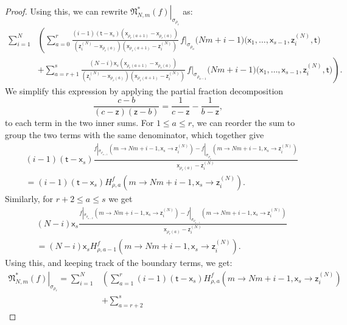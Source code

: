 \documentclass[11pt]{article}
\theoremstyle{definition}
\begin{document}
\begin{proof}
	Using this, we can rewrite $\left.\mathfrak{N}_{N,m}^{\ast}(f)\right|_{\sigma_{\rho_r}}$ as:
	\begin{align*}
		\sum_{i=1}^{N}&\left(\sum_{a=0}^{r}
			\frac{(i-1)(\mathsf{t}-\mathsf{x}_s)(\mathsf{x}_{\rho_r(a+1)}-\mathsf{x}_{\rho_r(a)})}{(\mathsf{z}_i^{(N)}-\mathsf{x}_{\rho_r(a)})(\mathsf{x}_{\rho_r(a+1)}-\mathsf{z}_i^{(N)})}\,
			f|_{\sigma_{\rho_a}}
			\bigl(Nm+i-1\bigr)
			\bigl(\mathsf{x}_1,\dots,\mathsf{x}_{s-1},\mathsf{z}_i^{(N)},\mathsf{t}\bigr)\right.\\
		&\left.+\sum_{a=r+1}^{s}
			  \frac{(N-i)\mathsf{x}_s(\mathsf{x}_{\rho_r(a+1)}-\mathsf{x}_{\rho_r(a)})}{(\mathsf{z}_i^{(N)}-\mathsf{x}_{\rho_r(a)})(\mathsf{x}_{\rho_r(a+1)}-\mathsf{z}_i^{(N)})}\,
			  f|_{\sigma_{\rho_{a-1}}}
			  \bigl(Nm+i-1\bigr)
		  \bigl(\mathsf{x}_1,\dots,\mathsf{x}_{s-1},\mathsf{z}_i^{(N)},\mathsf{t}\bigr)\right).
	\end{align*}
	We simplify this expression by applying the partial fraction decomposition
	\[
		\frac{c-b}{(c-\mathsf{z})(\mathsf{z}-b)}=\frac{1}{c-\mathsf{z}}-\frac{1}{b-\mathsf{z}},
	\]
	to each term in the two inner sums. For $1\le a\le r$, we can reorder the sum to group the two terms with the same denominator, which together give
	\begin{align*}
	&(i-1)(\mathsf{t}-\mathsf{x}_s)\frac{f|_{\sigma_{\rho_{a-1}}}(m\to Nm+i-1,\mathsf{x}_s\to \mathsf{z}_i^{(N)})-f|_{\sigma_{\rho_a}}(m\to Nm+i-1,\mathsf{x}_s\to \mathsf{z}_i^{(N)})}{\mathsf{x}_{\rho_r(a)}-\mathsf{z}_i^{(N)}}\\
	&=(i-1)(\mathsf{t}-\mathsf{x}_s)H_{\rho,a}^f(m\to Nm+i-1,\mathsf{x}_s\to \mathsf{z}_i^{(N)}).
	\end{align*}
	Similarly, for $r+2\le a\le s$ we get
	\begin{align*}
&(N-i)\mathsf{x}_s\frac{f|_{\sigma_{\rho_{a-2}}}(m\to Nm+i-1,\mathsf{x}_s\to \mathsf{z}_i^{(N)})-f|_{\sigma_{\rho_{a-1}}}(m\to Nm+i-1,\mathsf{x}_s\to \mathsf{z}_i^{(N)})}{\mathsf{x}_{\rho_r(a)}-\mathsf{z}_i^{(N)}}\\
&=(N-i)\mathsf{x}_sH_{\rho,a-1}^f(m\to Nm+i-1,\mathsf{x}_s\to \mathsf{z}_i^{(N)}).
	\end{align*}
	Using this, and keeping track of the boundary terms, we get:
	\begin{align*}
		\left.\mathfrak{N}_{N,m}^{\ast}(f)\right|_{\sigma_{\rho_r}}=\sum_{i=1}^{N}&\left(\sum_{a=1}^{r}(i-1)(\mathsf{t}-\mathsf{x}_s)H_{\rho,a}^f(m\to Nm+i-1,\mathsf{x}_s\to \mathsf{z}_i^{(N)})\right.\\
		&+\sum_{a=r+2}^{s}

\end{align*}
\end{proof}
\end{document}
